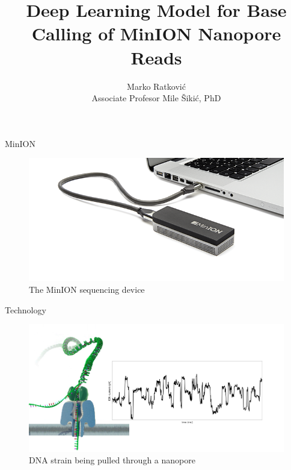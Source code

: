 \documentclass[10pt]{beamer}
\title{Deep Learning Model for Base Calling of MinION Nanopore Reads}
\date{}
\author{Marko Ratković\\
Associate Profesor Mile Šikić, PhD}
\institute{University of Zagreb\\ Faculty of Electrical Engineering and Computing}
\begin{document}
\maketitle



\begin{frame}[fragile]{MinION}
	\begin{figure}
		\begin{center}
			\includegraphics[width=1\textwidth]{imgs/minion.png}%
		    \caption{The MinION sequencing device}
		\end{center}
	\end{figure}
\end{frame}


\begin{frame}[fragile]{Technology}
	\begin{figure}
		
		\begin{center}
			\includegraphics[width=1\textwidth]{imgs/nanopore_no_bases.png}%
			\caption{DNA strain being pulled through a nanopore}
		\end{center}
	\end{figure}
\end{frame}
\end{document}
